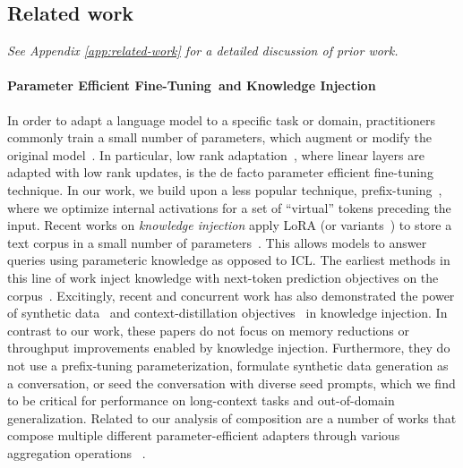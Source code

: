 \subsection{Related work}\label{sec:related_work}
\ifx\conference\icmlconf

\fi
\textit{See Appendix \ref{app:related-work} for a detailed discussion of prior work.}
\vspace{-1mm}
\paragraph{Parameter Efficient Fine-Tuning and Knowledge Injection}
In order to adapt a language model to a specific task or domain, practitioners commonly train a small number of parameters, which augment or modify the original model~\cite{hu2022lora,li2021prefix,lester2021power, meng2024pissa,zaken2021bitfit}.
In particular, low rank adaptation~\cite{hu2022lora}, where linear layers are adapted with low rank updates, is the de facto parameter efficient fine-tuning technique.
In our work, we build upon a less popular technique, prefix-tuning~\cite{li2021prefix,lester2021power}, where we optimize internal activations for a set of ``virtual'' tokens preceding the input.
Recent works on \textit{knowledge injection} apply LoRA (or variants~\cite{mao2025lift}) to store a text corpus in a small number of parameters~\cite{zhang2023plug,xiao2023plug,kujanpaa2024knowledge,mao2025lift,su2025parametricrag}.
This allows models to answer queries using parameteric knowledge as opposed to ICL.
The earliest methods in this line of work inject knowledge with next-token prediction objectives on the corpus~\cite{zhang2023plug,xiao2023plug,kuratov2025cramming}.
Excitingly, recent and concurrent work has also demonstrated the power of synthetic data~\cite{mao2025lift,su2025parametricrag} and context-distillation objectives~\cite{kujanpaa2024knowledge,caccia2025training} in knowledge injection.
In contrast to our work, these papers do not focus on memory reductions or throughput improvements enabled by knowledge injection.
Furthermore, they do not use a prefix-tuning parameterization, formulate synthetic data generation as a conversation, or seed the conversation with diverse seed prompts, which we find to be critical for performance on long-context tasks and out-of-domain generalization.
Related to our analysis of \artifact composition are a number of works that compose multiple different parameter-efficient adapters through various aggregation operations ~\cite{zhao2024merging,huang2023lorahub,xiao2024configurable,zhao2024loraretriever,yadav2024survey,wu2024mixture,gou2023mixture,li2024mixlora}.
\vspace{-1mm}
